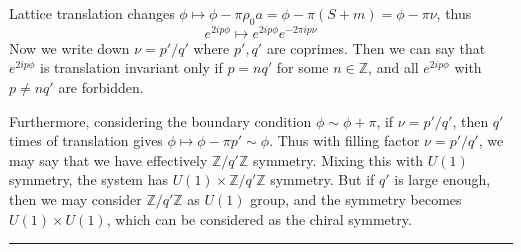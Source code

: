 Lattice translation changes $\phi\mapsto \phi-\pi\rho_0 a=\phi-\pi(S+m)=\phi-\pi\nu$, thus
\begin{equation}
e^{2ip\phi}\mapsto e^{2ip\phi}e^{-2\pi i p\nu}
\end{equation}
Now we write down $\nu=p'/q'$ where $p',q'$ are coprimes. Then we can say that $e^{2ip\phi}$ is translation invariant only if $p=nq'$ for some $n\in \mathbb{Z}$, and all $e^{2ip\phi}$ with $p\neq nq'$ are forbidden.

Furthermore, considering the boundary condition $\phi\sim \phi+\pi$, if $\nu=p'/q'$, then $q'$ times of translation gives $\phi\mapsto \phi-\pi p'\sim \phi$. Thus with filling factor $\nu=p'/q'$, we may say that we have effectively $\mathbb{Z}/q'\mathbb{Z}$ symmetry. Mixing this with $U(1)$ symmetry, the system has $U(1)\times \mathbb{Z}/q'\mathbb{Z}$ symmetry. But if $q'$ is large enough, then we may consider $\mathbb{Z}/q'\mathbb{Z}$ as $U(1)$ group, and the symmetry becomes $U(1)\times U(1)$, which can be considered as the chiral symmetry.
\noindent\rule{\textwidth}{1pt}
\newline